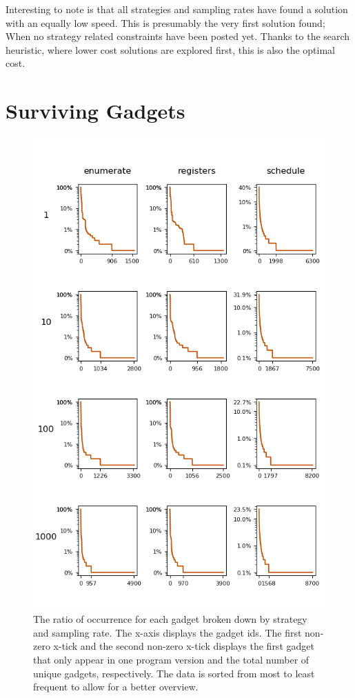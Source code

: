 Interesting to note is that all strategies and sampling rates have found a solution with
an equally low speed. This is presumably the very first solution found; When no strategy
related constraints have been posted yet. Thanks to the search heuristic, where lower cost
solutions are explored first, this is also the optimal cost.

\section{Surviving Gadgets}

\begin{figure}[htp]
	\centering
	\includegraphics[width=\textwidth,height=\textheight]{results/figures/gadgets}
	\caption{The ratio of occurrence for each gadget broken down by strategy and sampling rate.
The x-axis displays the gadget ids. The first non-zero x-tick and the second non-zero x-tick
displays the first gadget that only appear in one program version and the total number
of unique gadgets, respectively. The data is sorted from most to least frequent to allow
for a better overview.}
	\label{fig:gadgets}
\end{figure}

